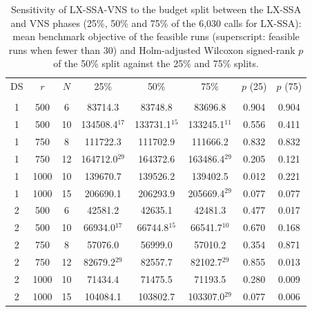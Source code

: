 \begin{table}[!t]
\centering
\caption{Sensitivity of LX-SSA-VNS to the budget split between the LX-SSA and VNS phases (25\%, 50\% and 75\% of the 6,030 calls for LX-SSA): mean benchmark objective of the feasible runs (superscript: feasible runs when fewer than 30) and Holm-adjusted Wilcoxon signed-rank $p$ of the 50\% split against the 25\% and 75\% splits.}
\label{tab:split}
\scriptsize\setlength{\tabcolsep}{2.5pt}
\begin{tabular}{cccccccc}
\toprule
DS & $r$ & $N$ & 25\% & 50\% & 75\% & $p$ (25) & $p$ (75) \\\\
\midrule
1 & 500 & 6 & 83714.3 & 83748.8 & 83696.8 & 0.904 & 0.904 \\
1 & 500 & 10 & 134508.4$^{17}$ & 133731.1$^{15}$ & 133245.1$^{11}$ & 0.556 & 0.411 \\
1 & 750 & 8 & 111722.3 & 111702.9 & 111666.2 & 0.832 & 0.832 \\
1 & 750 & 12 & 164712.0$^{29}$ & 164372.6 & 163486.4$^{29}$ & 0.205 & 0.121 \\
1 & 1000 & 10 & 139670.7 & 139526.2 & 139402.5 & 0.012 & 0.221 \\
1 & 1000 & 15 & 206690.1 & 206293.9 & 205669.4$^{29}$ & 0.077 & 0.077 \\
2 & 500 & 6 & 42581.2 & 42635.1 & 42481.3 & 0.477 & 0.017 \\
2 & 500 & 10 & 66934.0$^{17}$ & 66744.8$^{15}$ & 66541.7$^{10}$ & 0.670 & 0.168 \\
2 & 750 & 8 & 57076.0 & 56999.0 & 57010.2 & 0.354 & 0.871 \\
2 & 750 & 12 & 82679.2$^{29}$ & 82557.7 & 82102.7$^{29}$ & 0.855 & 0.013 \\
2 & 1000 & 10 & 71434.4 & 71475.5 & 71193.5 & 0.280 & 0.009 \\
2 & 1000 & 15 & 104084.1 & 103802.7 & 103307.0$^{29}$ & 0.077 & 0.006 \\
\bottomrule
\end{tabular}
\end{table}
